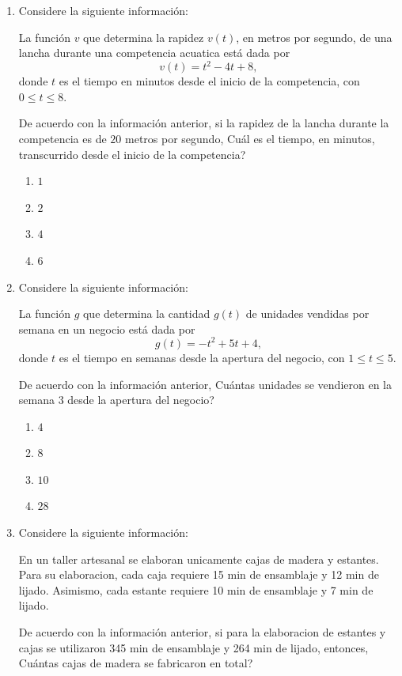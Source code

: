 \documentclass[12pt]{article}
\begin{document}
\begin{enumerate}[label=\textbf{\arabic*.}, itemsep=2.5cm]
\Needspace{0.44\textheight}
\item
Considere la siguiente informaci\'on:

La funci\'on $v$ que determina la rapidez $v(t)$, en metros por segundo, de una lancha durante una competencia acuatica est\'a dada por
\[
v(t) = t^2 - 4t + 8,
\]
donde $t$ es el tiempo en minutos desde el inicio de la competencia, con $0 \leq t \leq 8$.

De acuerdo con la informaci\'on anterior, si la rapidez de la lancha durante la competencia es de $20$ metros por segundo, \textquestiondown Cu\'al es el tiempo, en minutos, transcurrido desde el inicio de la competencia?

\begin{enumerate}[label=\Alph*)]
  \item $1$
  \item $2$
  \item $4$
  \item $6$
\end{enumerate}

\Needspace{0.42\textheight}
\item
Considere la siguiente informaci\'on:

La funci\'on $g$ que determina la cantidad $g(t)$ de unidades vendidas por semana en un negocio est\'a dada por
\[
g(t) = -t^2 + 5t + 4,
\]
donde $t$ es el tiempo en semanas desde la apertura del negocio, con $1 \leq t \leq 5$.

De acuerdo con la informaci\'on anterior, \textquestiondown Cu\'antas unidades se vendieron en la semana $3$ desde la apertura del negocio?

\begin{enumerate}[label=\Alph*)]
  \item $4$
  \item $8$
  \item $10$
  \item $28$
\end{enumerate}

\Needspace{0.55\textheight}
\item
Considere la siguiente informaci\'on:

En un taller artesanal se elaboran unicamente cajas de madera y estantes. Para su elaboracion, cada caja requiere 15 min de ensamblaje y 12 min de lijado. Asimismo, cada estante requiere 10 min de ensamblaje y 7 min de lijado.

De acuerdo con la informaci\'on anterior, si para la elaboracion de estantes y cajas se utilizaron 345 min de ensamblaje y 264 min de lijado, entonces, \textquestiondown Cu\'antas cajas de madera se fabricaron en total?


\end{enumerate}
\end{document}
